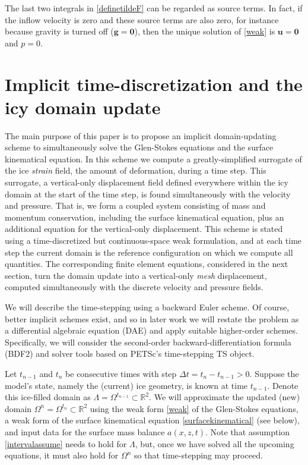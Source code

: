 \documentclass[letterpaper,final,12pt,reqno]{amsart}
\newcommand{\RR}{\mathbb{R}}
\newcommand{\bg}{\mathbf{g}}
\newcommand{\bu}{\mathbf{u}}
\newcommand{\bzero}{\bm{0}}
\begin{document}
The last two integrals in \eqref{definetildeF} can be regarded as source terms.  In fact, if the inflow velocity is zero and these source terms are also zero, for instance because gravity is turned off ($\bg=\bzero$), then the unique solution of \eqref{weak} is $\bu=\bzero$ and $p=0$.


\section{Implicit time-discretization and the icy domain update} \label{sec:implicitstep}

The main purpose of this paper is to propose an implicit domain-updating scheme to simultaneously solve the Glen-Stokes equations and the surface kinematical equation.  In this scheme we compute a greatly-simplified surrogate of the ice \emph{strain} field, the amount of deformation, during a time step.  This surrogate, a vertical-only displacement field defined everywhere within the icy domain at the start of the time step, is found simultaneously with the velocity and pressure.  That is, we form a coupled system consisting of mass and momentum conservation, including the surface kinematical equation, plus an additional equation for the vertical-only displacement.  This scheme is stated using a time-discretized but continuous-space weak formulation, and at each time step the current domain is the reference configuration on which we compute all quantities.  The corresponding finite element equations, considered in the next section, turn the domain update into a vertical-only \emph{mesh} displacement, computed simultaneously with the discrete velocity and pressure fields.

We will describe the time-stepping using a backward Euler scheme.  Of course, better implicit schemes exist, and so in later work we will restate the problem as a differential algebraic equation (DAE) and apply suitable higher-order schemes.  Specifically, we will consider the second-order backward-differentiation formula (BDF2) \cite{AscherPetzold1998} and solver tools based on PETSc's \cite{Balayetal2020,BuelerBook} time-stepping TS object.

Let $t_{n-1}$ and $t_n$ be consecutive times with step $\Delta t = t_n - t_{n-1} > 0$.  Suppose the model's state, namely the (current) ice geometry, is known at time $t_{n-1}$.  Denote this ice-filled domain as $\Lambda = \Omega^{t_{n-1}} \subset \RR^2$.  We will approximate the updated (new) domain $\Omega^n = \Omega^{t_n} \subset \RR^2$ using the weak form \eqref{weak} of the Glen-Stokes equations, a weak form of the surface kinematical equation \eqref{surfacekinematical} (see below), and input data for the surface mass balance $a(x,z,t)$.  Note that assumption \eqref{intervalassume} needs to hold for $\Lambda$, but, once we have solved all the upcoming equations, it must also hold for $\Omega^n$ so that time-stepping may proceed.
\end{document}
